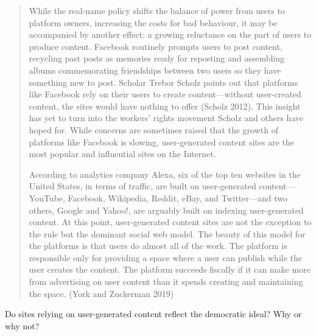 \documentclass[
  letterpaper,
  DIV=11,
  numbers=noendperiod]{scrreprt}
\begin{document}
\begin{quote}
While the real-name policy shifts the balance of power from users to
platform owners, increasing the costs for bad behaviour, it may be
accompanied by another effect: a growing reluctance on the part of users
to produce content. Facebook routinely prompts users to post content,
recycling past posts as memories ready for reposting and assembling
albums commemorating friendships between two users so they have
something new to post. Scholar Trebor Scholz points out that platforms
like Facebook rely on their users to create content---without
user-created content, the sites would have nothing to offer (Scholz
2012). This insight has yet to turn into the workers' rights movement
Scholz and others have hoped for. While concerns are sometimes raised
that the growth of platforms like Facebook is slowing, user-generated
content sites are the most popular and influential sites on the
Internet.

According to analytics company Alexa, six of the top ten websites in the
United States, in terms of traffic, are built on user-generated
content---YouTube, Facebook, Wikipedia, Reddit, eBay, and Twitter---and
two others, Google and Yahoo!, are arguably built on indexing
user-generated content. At this point, user-generated content sites are
not the exception to the rule but the dominant social web model. The
beauty of this model for the platforms is that users do almost all of
the work. The platform is responsible only for providing a space where a
user can publish while the user creates the content. The platform
succeeds fiscally if it can make more from advertising on user content
than it spends creating and maintaining the space. (York and Zuckerman
2019)
\end{quote}

\begin{tcolorbox}[enhanced jigsaw, arc=.35mm, bottomrule=.15mm, bottomtitle=1mm, breakable, colback=white, colbacktitle=quarto-callout-tip-color!10!white, colframe=quarto-callout-tip-color-frame, coltitle=black, left=2mm, leftrule=.75mm, opacityback=0, opacitybacktitle=0.6, rightrule=.15mm, title=\textcolor{quarto-callout-tip-color}{\faLightbulb}\hspace{0.5em}{Stop and reflect}, titlerule=0mm, toprule=.15mm, toptitle=1mm]

Do sites relying on user-generated content reflect the democratic ideal?
Why or why not?

\end{tcolorbox}
\end{document}

